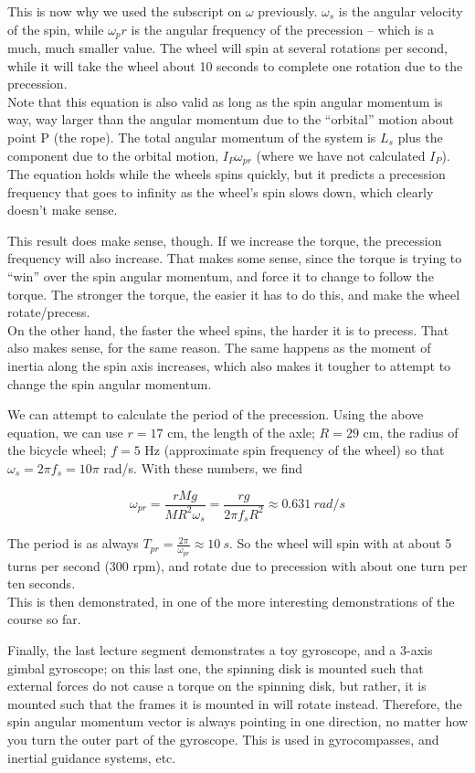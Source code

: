 This is now why we used the subscript on $\omega$ previously. $\omega_s$ is the angular velocity of the spin, while $\omega_pr$ is the angular frequency of the precession -- which is a much, much smaller value. The wheel will spin at several rotations per second, while it will take the wheel about 10 seconds to complete one rotation due to the precession.\\
Note that this equation is also valid as long as the spin angular momentum is way, way larger than the angular momentum due to the ``orbital'' motion about point P (the rope). The total angular momentum of the system is $L_s$ plus the component due to the orbital motion, $I_P \omega_{pr}$ (where we have not calculated $I_P$).\\
The equation holds while the wheels spins quickly, but it predicts a precession frequency that goes to infinity as the wheel's spin slows down, which clearly doesn't make sense.

This result does make sense, though. If we increase the torque, the precession frequency will also increase. That makes some sense, since the torque is trying to ``win'' over the spin angular momentum, and force it to change to follow the torque. The stronger the torque, the easier it has to do this, and make the wheel rotate/precess.\\
On the other hand, the faster the wheel spins, the harder it is to precess. That also makes sense, for the same reason. The same happens as the moment of inertia along the spin axis increases, which also makes it tougher to attempt to change the spin angular momentum.

We can attempt to calculate the period of the precession. Using the above equation, we can use $r = 17$ cm, the length of the axle; $R = 29$ cm, the radius of the bicycle wheel; $f = 5$ Hz (approximate spin frequency of the wheel) so that $\omega_s = 2 \pi f_s = 10 \pi$ rad/s. With these numbers, we find

\begin{equation}
\omega_{pr} = \frac{r M g}{M R^2 \omega_s} = \frac{r g}{2 \pi f_s R^2} \approx \SI{0.631}{rad/s}
\end{equation}

The period is as always $T_{pr} = \frac{2 \pi}{\omega_{pr}} \approx \SI{10}{s}$. So the wheel will spin with at about 5 turns per second (300 rpm), and rotate due to precession with about one turn per ten seconds.\\
This is then demonstrated, in one of the more interesting demonstrations of the course so far.

Finally, the last lecture segment demonstrates a toy gyroscope, and a 3-axis gimbal gyroscope; on this last one, the spinning disk is mounted such that external forces do not cause a torque on the spinning disk, but rather, it is mounted such that the frames it is mounted in will rotate instead. Therefore, the spin angular momentum vector is always pointing in one direction, no matter how you turn the outer part of the gyroscope. This is used in gyrocompasses, and inertial guidance systems, etc.

